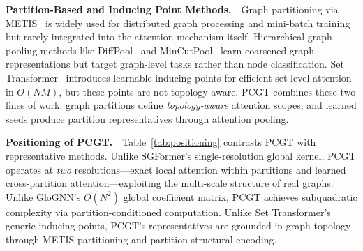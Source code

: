 \textbf{Partition-Based and Inducing Point Methods.}~~Graph partitioning via METIS~\citep{karypis1998metis} is widely used for distributed graph processing and mini-batch training~\citep{chiang2019clustergcn} but rarely integrated into the attention mechanism itself. Hierarchical graph pooling methods like DiffPool~\citep{ying2018hierarchical} and MinCutPool~\citep{bianchi2020mincut} learn coarsened graph representations but target graph-level tasks rather than node classification. Set Transformer~\citep{lee2019set} introduces learnable inducing points for efficient set-level attention in $O(NM)$, but these points are not topology-aware. PCGT combines these two lines of work: graph partitions define \emph{topology-aware} attention scopes, and learned seeds produce partition representatives through attention pooling.

\textbf{Positioning of PCGT.}~~Table~\ref{tab:positioning} contrasts PCGT with representative methods. Unlike SGFormer's single-resolution global kernel, PCGT operates at \emph{two} resolutions---exact local attention within partitions and learned cross-partition attention---exploiting the multi-scale structure of real graphs. Unlike GloGNN's $O(N^2)$ global coefficient matrix, PCGT achieves subquadratic complexity via partition-conditioned computation. Unlike Set Transformer's generic inducing points, PCGT's representatives are grounded in graph topology through METIS partitioning and partition structural encoding.

\begin{table}[t]
\centering
{}%
\caption{Method comparison. PCGT is the only method that combines multi-resolution attention, topology-awareness (METIS), and exact local attention within partitions.}
\label{tab:positioning}
\end{table}

